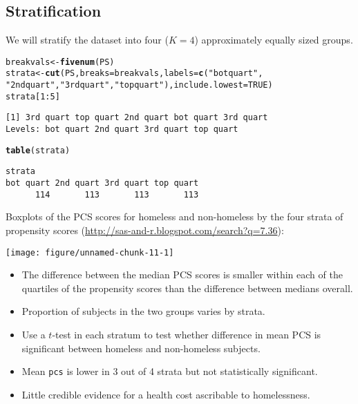 \documentclass[oneside]{book}\usepackage[]{graphicx}\usepackage[svgnames]{xcolor}
\makeatletter
\def\maxwidth{ %
  \ifdim\Gin@nat@width>\linewidth
    \linewidth
  \else
    \Gin@nat@width
  \fi
}
\newcommand{\hlnum}[1]{\textcolor[rgb]{0.686,0.059,0.569}{#1}}%
\newcommand{\hlstr}[1]{\textcolor[rgb]{0.192,0.494,0.8}{#1}}%
\newcommand{\hlopt}[1]{\textcolor[rgb]{0,0,0}{#1}}%
\newcommand{\hlstd}[1]{\textcolor[rgb]{0.345,0.345,0.345}{#1}}%
\newcommand{\hlkwb}[1]{\textcolor[rgb]{0.69,0.353,0.396}{#1}}%
\newcommand{\hlkwc}[1]{\textcolor[rgb]{0.333,0.667,0.333}{#1}}%
\newcommand{\hlkwd}[1]{\textcolor[rgb]{0.737,0.353,0.396}{\textbf{#1}}}%
\newenvironment{kframe}{%
 \def\at@end@of@kframe{}%
 \ifinner\ifhmode%
  \def\at@end@of@kframe{\end{minipage}}%
  \begin{minipage}{\columnwidth}%
 \fi\fi%
 \def\FrameCommand##1{\hskip\@totalleftmargin \hskip-\fboxsep
 \colorbox{shadecolor}{##1}\hskip-\fboxsep
     \hskip-\linewidth \hskip-\@totalleftmargin \hskip\columnwidth}%
 \MakeFramed {\advance\hsize-\width
   \@totalleftmargin\z@ \linewidth\hsize
   \@setminipage}}%
 {\par\unskip\endMakeFramed%
 \at@end@of@kframe}
\newenvironment{knitrout}{}{} %
\makeatother
\begin{document}
\subsection{Stratification}
We will stratify the dataset into four ($K=4$) approximately equally
sized groups.
\begin{knitrout}
\color{fgcolor}\begin{kframe}
\begin{alltt}
\hlstd{breakvals} \hlkwb{<-} \hlkwd{fivenum}\hlstd{(PS)}
\hlstd{strata} \hlkwb{<-} \hlkwd{cut}\hlstd{(PS,} \hlkwc{breaks} \hlstd{= breakvals,} \hlkwc{labels} \hlstd{=} \hlkwd{c}\hlstd{(}\hlstr{"bot quart"}\hlstd{,}
  \hlstr{"2nd quart"}\hlstd{,} \hlstr{"3rd quart"}\hlstd{,} \hlstr{"top quart"}\hlstd{),} \hlkwc{include.lowest} \hlstd{=} \hlnum{TRUE}\hlstd{)}
\hlstd{strata[}\hlnum{1}\hlopt{:}\hlnum{5}\hlstd{]}
\end{alltt}
\begin{verbatim}
[1] 3rd quart top quart 2nd quart bot quart 3rd quart
Levels: bot quart 2nd quart 3rd quart top quart
\end{verbatim}
\begin{alltt}
\hlkwd{table}\hlstd{(strata)}
\end{alltt}
\begin{verbatim}
strata
bot quart 2nd quart 3rd quart top quart 
      114       113       113       113 
\end{verbatim}
\end{kframe}
\end{knitrout}
Boxplots of the PCS scores for homeless and non-homeless by the
four strata of propensity scores (\url{http://sas-and-r.blogspot.com/search?q=7.36}):
\begin{knitrout}
\color{fgcolor}

{\centering \texttt{[image: figure/unnamed-chunk-11-1]} 

}


\end{knitrout}
\begin{itemize}
      \item The difference between the median PCS scores is smaller
            within each of the quartiles of the propensity scores than the
            difference between medians overall.
      \item Proportion of subjects in the two groups varies by strata.
      \item Use a $t$-test in each stratum to test whether difference in mean
            PCS is significant between homeless and non-homeless
            subjects.
      \item Mean \texttt{pcs} is lower in 3 out of 4 strata but not statistically
            significant.
      \item Little credible evidence for a health cost ascribable to
            homelessness.
\end{itemize}
\end{document}
